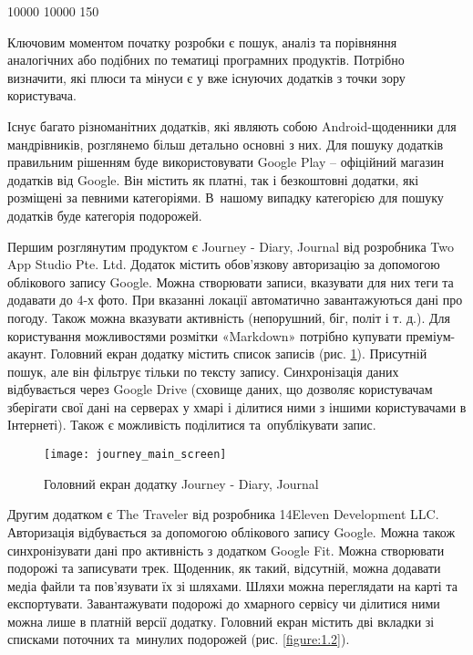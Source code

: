 \documentclass[../main.tex]{subfiles}
\begin{document}
{

 10000 10000 150 %

Ключовим моментом початку розробки є пошук, аналіз та порівняння аналогічних або подібних по тематиці програмних продуктів. Потрібно визначити, які плюси та мінуси є у вже існуючих додатків з точки зору користувача.

Існує багато різноманітних додатків, які являють собою Android-щоденники для мандрівників, розглянемо більш детально основні з них. Для пошуку додатків правильним рішенням буде використовувати Google Play -- офіційний магазин додатків від Google. Він містить як платні, так і безкоштовні додатки, які розміщені за певними категоріями. В~нашому випадку категорією для пошуку додатків буде категорія подорожей.

Першим розглянутим продуктом є Journey - Diary, Journal від розробника Two App Studio Pte. Ltd. Додаток містить обов'язкову авторизацію за допомогою облікового запису Google. Можна створювати записи, вказувати для них теги та додавати до 4-х фото. При вказанні локації автоматично завантажуються дані про погоду. Також можна вказувати активність (непорушний, біг, політ і т. д.). Для користування можливостями розмітки «Markdown» потрібно купувати преміум-акаунт. Головний екран додатку містить список записів (рис. \ref{figure:1.1}). Присутній пошук, але він фільтрує тільки по тексту запису. Синхронізація даних відбувається через Google Drive (сховище даних, що дозволяє користувачам зберігати свої дані на серверах у хмарі і ділитися ними з іншими користувачами в Інтернеті). Також є можливість поділитися та~опублікувати запис. 

\begin{figure}[H]
\centering
\texttt{[image: journey\_main\_screen]}
\caption{Головний екран додатку Journey - Diary, Journal}
\label{figure:1.1}
\end{figure}

Другим додатком є The Traveler від розробника 14Eleven Development LLC. Авторизація відбувається за допомогою облікового запису Google. Можна також синхронізувати дані про активність з додатком Google Fit. Можна створювати подорожі та записувати трек. Щоденник, як такий, відсутній, можна додавати медіа файли та пов'язувати їх зі шляхами. Шляхи можна переглядати на карті та експортувати. Завантажувати подорожі до хмарного сервісу чи ділитися ними можна лише в платній версії додатку. Головний екран містить дві вкладки зі списками поточних та~минулих подорожей (рис. \ref{figure:1.2}). 

}
\end{document}
